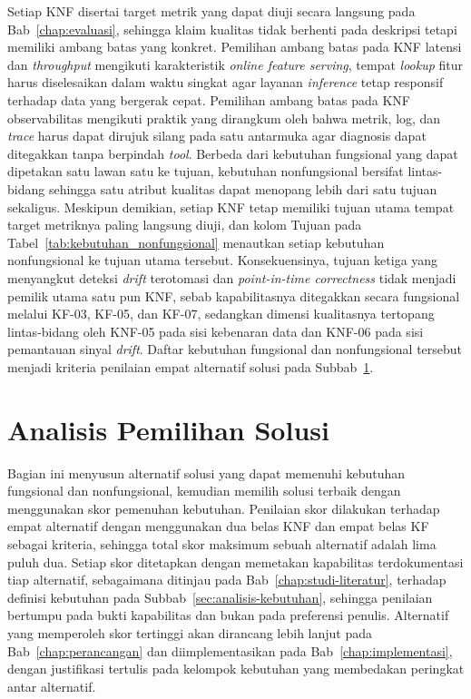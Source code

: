 

Setiap KNF disertai target metrik yang dapat diuji secara langsung pada Bab~\ref{chap:evaluasi}, sehingga klaim kualitas tidak berhenti pada deskripsi tetapi memiliki ambang batas yang konkret. Pemilihan ambang batas pada KNF latensi dan \textit{throughput} mengikuti karakteristik \textit{online feature serving}, tempat \textit{lookup} fitur harus diselesaikan dalam waktu singkat agar layanan \textit{inference} tetap responsif terhadap data yang bergerak cepat. Pemilihan ambang batas pada KNF observabilitas mengikuti praktik yang dirangkum oleh \textcite{cncf2024observability} bahwa metrik, log, dan \textit{trace} harus dapat dirujuk silang pada satu antarmuka agar diagnosis dapat ditegakkan tanpa berpindah \textit{tool}. Berbeda dari kebutuhan fungsional yang dapat dipetakan satu lawan satu ke tujuan, kebutuhan nonfungsional bersifat lintas-bidang sehingga satu atribut kualitas dapat menopang lebih dari satu tujuan sekaligus. Meskipun demikian, setiap KNF tetap memiliki tujuan utama tempat target metriknya paling langsung diuji, dan kolom Tujuan pada Tabel~\ref{tab:kebutuhan_nonfungsional} menautkan setiap kebutuhan nonfungsional ke tujuan utama tersebut. Konsekuensinya, tujuan ketiga yang menyangkut deteksi \textit{drift} terotomasi dan \textit{point-in-time correctness} tidak menjadi pemilik utama satu pun KNF, sebab kapabilitasnya ditegakkan secara fungsional melalui KF-03, KF-05, dan KF-07, sedangkan dimensi kualitasnya tertopang lintas-bidang oleh KNF-05 pada sisi kebenaran data dan KNF-06 pada sisi pemantauan sinyal \textit{drift}. Daftar kebutuhan fungsional dan nonfungsional tersebut menjadi kriteria penilaian empat alternatif solusi pada Subbab~\ref{sec:pemilihan-solusi}.

\section{Analisis Pemilihan Solusi}
\label{sec:pemilihan-solusi}

Bagian ini menyusun alternatif solusi yang dapat memenuhi kebutuhan fungsional dan nonfungsional, kemudian memilih solusi terbaik dengan menggunakan skor pemenuhan kebutuhan. Penilaian skor dilakukan terhadap empat alternatif dengan menggunakan dua belas KNF dan empat belas KF sebagai kriteria, sehingga total skor maksimum sebuah alternatif adalah lima puluh dua. Setiap skor ditetapkan dengan memetakan kapabilitas terdokumentasi tiap alternatif, sebagaimana ditinjau pada Bab~\ref{chap:studi-literatur}, terhadap definisi kebutuhan pada Subbab~\ref{sec:analisis-kebutuhan}, sehingga penilaian bertumpu pada bukti kapabilitas dan bukan pada preferensi penulis. Alternatif yang memperoleh skor tertinggi akan dirancang lebih lanjut pada Bab~\ref{chap:perancangan} dan diimplementasikan pada Bab~\ref{chap:implementasi}, dengan justifikasi tertulis pada kelompok kebutuhan yang membedakan peringkat antar alternatif.

